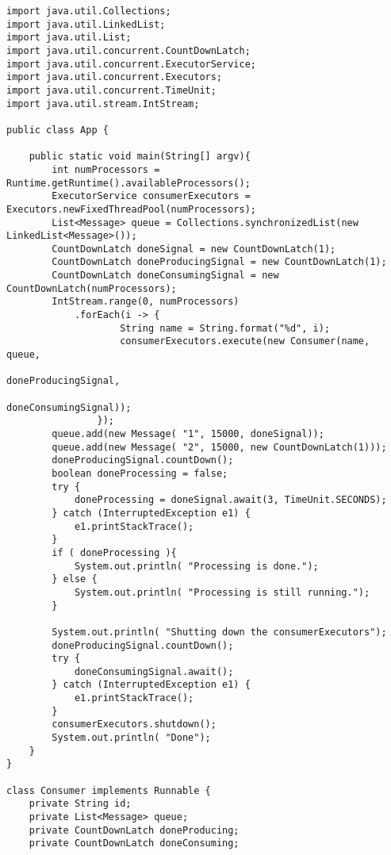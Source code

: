 \documentclass{latex/classes/myarticle}
\begin{document}
\begin{lstlisting}
import java.util.Collections;
import java.util.LinkedList;
import java.util.List;
import java.util.concurrent.CountDownLatch;
import java.util.concurrent.ExecutorService;
import java.util.concurrent.Executors;
import java.util.concurrent.TimeUnit;
import java.util.stream.IntStream;

public class App {

    public static void main(String[] argv){
        int numProcessors = Runtime.getRuntime().availableProcessors();
        ExecutorService consumerExecutors = Executors.newFixedThreadPool(numProcessors);
        List<Message> queue = Collections.synchronizedList(new LinkedList<Message>());
        CountDownLatch doneSignal = new CountDownLatch(1);
        CountDownLatch doneProducingSignal = new CountDownLatch(1);
        CountDownLatch doneConsumingSignal = new CountDownLatch(numProcessors);
        IntStream.range(0, numProcessors)
            .forEach(i -> {
                    String name = String.format("%d", i);
                    consumerExecutors.execute(new Consumer(name, queue,
                                                           doneProducingSignal,
                                                           doneConsumingSignal));
                });
        queue.add(new Message( "1", 15000, doneSignal));
        queue.add(new Message( "2", 15000, new CountDownLatch(1)));
        doneProducingSignal.countDown();
        boolean doneProcessing = false;
        try {
            doneProcessing = doneSignal.await(3, TimeUnit.SECONDS);
        } catch (InterruptedException e1) {
            e1.printStackTrace();
        }
        if ( doneProcessing ){
            System.out.println( "Processing is done.");
        } else {
            System.out.println( "Processing is still running.");
        }

        System.out.println( "Shutting down the consumerExecutors");
        doneProducingSignal.countDown();
        try {
            doneConsumingSignal.await();
        } catch (InterruptedException e1) {
            e1.printStackTrace();
        }
        consumerExecutors.shutdown();
        System.out.println( "Done");
    }
}

class Consumer implements Runnable {
    private String id;
    private List<Message> queue;
    private CountDownLatch doneProducing;
    private CountDownLatch doneConsuming;


\end{lstlisting}
\end{document}
